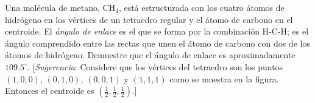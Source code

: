 \item Una molécula de metano, $\text{CH}_4$, está estructurada con los cuatro átomos de hidrógeno en los vértices de un tetraedro regular y el átomo de carbono en el centroide. El \textit{ángulo de enlace} es el que se forma por la combinación H-C-H; es el ángulo comprendido entre las rectas que unen el átomo de carbono con dos de los átomos de hidrógeno. Demuestre que el ángulo de enlace es aproximadamente $109.5^\circ$. [\textit{Sugerencia}: Considere que los vértices del tetraedro son los puntos $(1, 0, 0)$, $(0, 1, 0)$, $(0, 0, 1)$ y $(1, 1, 1)$ como se muestra en la figura. Entonces el centroide es $\left( \frac{1}{2}, \frac{1}{2}, \frac{1}{2} \right)$.]
    
    \begin{center}
    \end{center}
